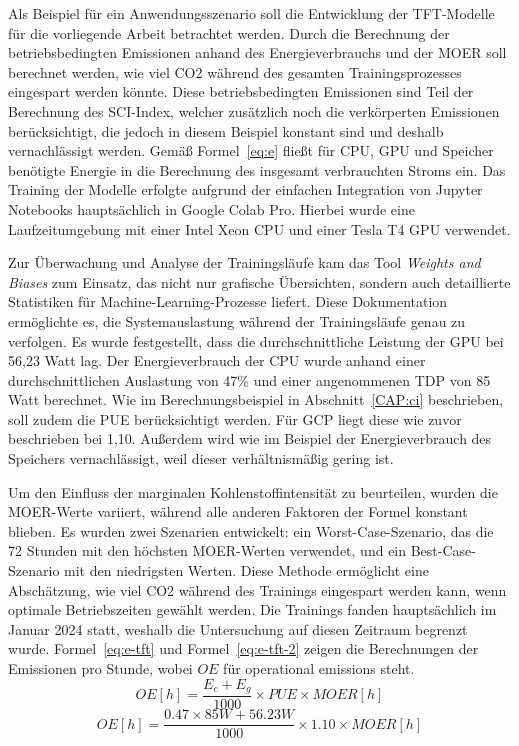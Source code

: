 Als Beispiel für ein Anwendungsszenario soll die Entwicklung der \ac{TFT}-Modelle für die vorliegende Arbeit betrachtet werden.
Durch die Berechnung der betriebsbedingten Emissionen anhand des Energieverbrauchs und der \ac{MOER} soll berechnet werden, wie viel \ac{CO2} während des gesamten Trainingsprozesses eingespart werden könnte.
Diese betriebsbedingten Emissionen sind Teil der Berechnung des \ac{SCI}-Index, welcher zusätzlich noch die verkörperten Emissionen berücksichtigt, die jedoch in diesem Beispiel konstant sind und deshalb vernachlässigt werden.
Gemäß Formel~\ref{eq:e} fließt für \ac{CPU}, \ac{GPU} und Speicher benötigte Energie in die Berechnung des insgesamt verbrauchten Stroms ein.
Das Training der Modelle erfolgte aufgrund der einfachen Integration von Jupyter Notebooks hauptsächlich in Google Colab Pro.
Hierbei wurde eine Laufzeitumgebung mit einer Intel Xeon \ac{CPU} und einer Tesla T4 \ac{GPU} verwendet.

Zur Überwachung und Analyse der Trainingsläufe kam das Tool \textit{Weights and Biases} zum Einsatz, das nicht nur grafische Übersichten, sondern auch detaillierte Statistiken für Machine-Learning-Prozesse liefert.
Diese Dokumentation ermöglichte es, die Systemauslastung während der Trainingsläufe genau zu verfolgen.
Es wurde festgestellt, dass die durchschnittliche Leistung der \ac{GPU} bei 56,23 Watt lag.
Der Energieverbrauch der \ac{CPU} wurde anhand einer durchschnittlichen Auslastung von 47\% und einer angenommenen \ac{TDP} von 85 Watt berechnet\cite{Intel.20240418}.
Wie im Berechnungsbeispiel in Abschnitt~\ref{CAP:ci} beschrieben, soll zudem die \ac{PUE} berücksichtigt werden.
Für \ac{GCP} liegt diese wie zuvor beschrieben bei 1,10.
Außerdem wird wie im Beispiel der Energieverbrauch des Speichers vernachlässigt, weil dieser verhältnismäßig gering ist.

Um den Einfluss der marginalen Kohlenstoffintensität zu beurteilen, wurden die \ac{MOER}-Werte variiert, während alle anderen Faktoren der Formel konstant blieben.
Es wurden zwei Szenarien entwickelt: ein Worst-Case-Szenario, das die 72 Stunden mit den höchsten \ac{MOER}-Werten verwendet, und ein Best-Case-Szenario mit den niedrigsten Werten.
Diese Methode ermöglicht eine Abschätzung, wie viel \ac{CO2} während des Trainings eingespart werden kann, wenn optimale Betriebszeiten gewählt werden.
Die Trainings fanden hauptsächlich im Januar 2024 statt, weshalb die Untersuchung auf diesen Zeitraum begrenzt wurde.
Formel~\ref{eq:e-tft} und Formel~\ref{eq:e-tft-2} zeigen die Berechnungen der Emissionen pro Stunde, wobei $OE$ für \glqq operational emissions \grqq{} steht.
\begin{equation}
 \label{eq:e-tft}
 OE[h] = \frac{E_c + E_g}{1000} \times PUE \times MOER[h]
\end{equation}
\begin{equation}
 \label{eq:e-tft-2}
 OE[h] = \frac{0.47 \times 85W + 56.23W}{1000} \times 1.10 \times MOER[h]
\end{equation}

